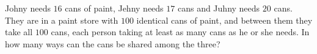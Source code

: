 Johny needs $16$ cans of paint, Jehny needs $17$ cans and Juhny needs $20$ cans. They are in a paint store with $100$ identical cans of paint, and between them they take all $100$ cans, each person taking at least as many cans as he or she needs. In how many ways can the cans be shared among the three?
